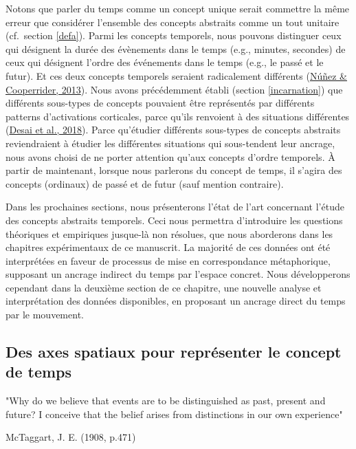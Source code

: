 \documentclass[
  a4paper,12pt,twoside,onecolumn,openright,final,oldfontcommands]{memoir}
\begin{document}
Notons que parler du temps comme un concept unique serait commettre la même erreur que considérer l'ensemble des concepts abstraits comme un tout unitaire (cf.~section \ref{defa}). Parmi les concepts temporels, nous pouvons distinguer ceux qui désignent la durée des évènements dans le temps (e.g., minutes, secondes) de ceux qui désignent l'ordre des événements dans le temps (e.g., le passé et le futur). Et ces deux concepts temporels seraient radicalement différents (\protect\hyperlink{ref-nunez_tangle_2013}{Núñez \& Cooperrider, 2013}). Nous avons précédemment établi (section \ref{incarnation}) que différents sous-types de concepts pouvaient être représentés par différents patterns d'activations corticales, parce qu'ils renvoient à des situations différentes (\protect\hyperlink{ref-desai_multifaceted_2018}{Desai et al., 2018}). Parce qu'étudier différents sous-types de concepts abstraits reviendraient à étudier les différentes situations qui sous-tendent leur ancrage, nous avons choisi de ne porter attention qu'aux concepts d'ordre temporels. À partir de maintenant, lorsque nous parlerons du concept de temps, il s'agira des concepts (ordinaux) de passé et de futur (sauf mention contraire).

Dans les prochaines sections, nous présenterons l'état de l'art concernant l'étude des concepts abstraits temporels. Ceci nous permettra d'introduire les questions théoriques et empiriques jusque-là non résolues, que nous aborderons dans les chapitres expérimentaux de ce manuscrit. La majorité de ces données ont été interprétées en faveur de processus de mise en correspondance métaphorique, supposant un ancrage indirect du temps par l'espace concret. Nous développerons cependant dans la deuxième section de ce chapitre, une nouvelle analyse et interprétation des données disponibles, en proposant un ancrage direct du temps par le mouvement.

\hypertarget{axes}{%
\subsection{Des axes spatiaux pour représenter le concept de temps}\label{axes}}

\epigraph{"Why do we believe that events are to be distinguished as past, present and future? I conceive that the belief arises from distinctions in our own experience"}{McTaggart, J. E. (1908, p.471)}
\end{document}
